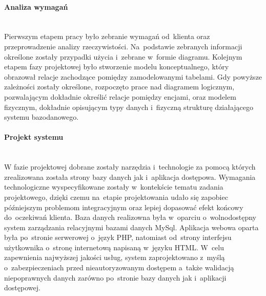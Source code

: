 \documentclass[a4paper, 12pt]{article}
\begin{document}
\paragraph{Analiza wymagań} \mbox{}\\
Pierwszym etapem pracy było zebranie wymagań od~klienta oraz przeprowadzenie analizy rzeczywistości. Na~podstawie zebranych informacji określone zostały przypadki użycia i~zebrane w~formie diagramu. Kolejnym etapem fazy projektowej było stworzenie modelu konceptualnego, który obrazował relacje zachodzące pomiędzy zamodelowanymi tabelami. Gdy powyższe zależności zostały określone, rozpoczęto prace nad diagramem logicznym, pozwalającym dokładnie określić relacje pomiędzy encjami, oraz modelem fizycznym, dokładnie opisującym typy danych i~fizyczną strukturę działającego systemu bazodanowego.

\paragraph{Projekt systemu} \mbox{}\\
W fazie projektowej dobrane zostały narzędzia i~technologie za pomocą których zrealizowana została strony bazy danych jak i~aplikacja dostępowa. Wymagania technologiczne wyspecyfikowane zostały w~kontekście tematu zadania projektowego, dzięki czemu na~etapie projektowania udało się zapobiec późniejszym problemom integracyjnym oraz lepiej dopasować efekt końcowy do~oczekiwań klienta. Baza danych realizowna była w~oparciu o~wolnodostępny system zarządzania relacyjnymi bazami danych MySql. Aplikacja webowa oparta była po~stronie serwerowej o~język PHP, natomiast od~strony interfejsu użytkownika o~stronę internetową napisaną w~języku HTML. W~celu zapewnienia najwyższej jakości usług, system zaprojektowano z~myślą o~zabezpieczeniach przed nieautoryzowanym dostępem a~także walidacją niepoprawnych danych zarówno po~stronie bazy danych jak i~aplikacji dostępowej.
\end{document}
